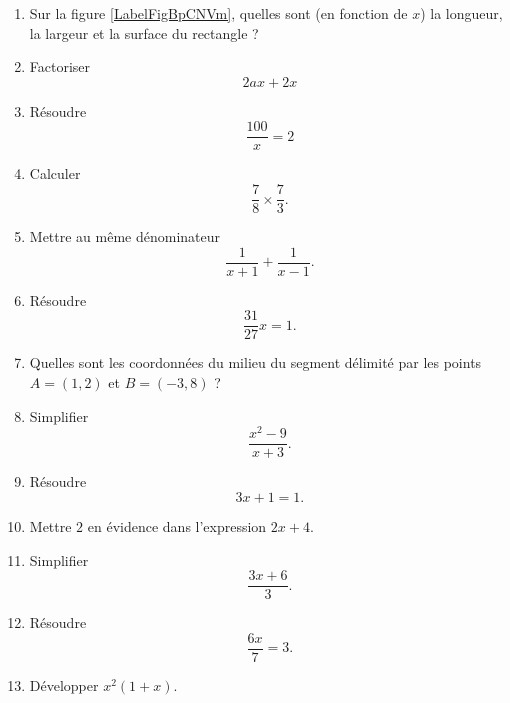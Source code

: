 \begin{exercice}
\begin{multicols}{2}
\begin{enumerate}
        \item
Sur la figure \ref{LabelFigBpCNVm}, quelles sont (en fonction de \( x\)) la longueur, la largeur et la surface du rectangle ?
\newcommand{\CaptionFigBpCNVm}{figure de l'exercice \ref{exoSeconde-0018}} 

        \item
            Factoriser
            \begin{equation}
                2ax+2x   
            \end{equation}
        \item
            Résoudre
            \begin{equation}
                \frac{ 100 }{ x }=2
            \end{equation}
        \item
            Calculer
            \begin{equation}
                \frac{ 7 }{ 8 }\times\frac{ 7 }{ 3 }.
            \end{equation}
        \item
            Mettre au même dénominateur
            \begin{equation}
                \frac{1}{ x+1 }+\frac{1}{ x-1 }.
            \end{equation}

        \item
            Résoudre
            \begin{equation}
                \frac{ 31 }{ 27 }x=1.
            \end{equation}
        \item
            Quelles sont les coordonnées du milieu du segment délimité par les points \( A=(1,2)\) et \( B=(-3,8)\) ?
        \item
            Simplifier
            \begin{equation}
                \frac{ x^2-9 }{ x+3 }.
            \end{equation}
        \item
            Résoudre
            \begin{equation}
                3x+1=1.
            \end{equation}

        \item
            Mettre \( 2\) en évidence dans l'expression \( 2x+4\).
        \item
            Simplifier
            \begin{equation}
                \frac{ 3x+6 }{ 3 }.
            \end{equation}
        \item
            Résoudre
            \begin{equation}
                \frac{ 6x }{ 7 }=3.
            \end{equation}
        \item
            Développer \( x^2(1+x)\).


\end{enumerate}
\end{multicols}
\end{exercice}
